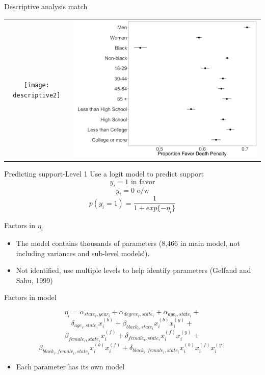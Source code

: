 \documentclass{beamer}
\begin{document}
	\begin{frame}{Descriptive analysis match}
		\begin{tabular}{cc}
		\texttt{[image: descriptive2]}&\includegraphics[scale=.15]{mydescriptive2} \\
		\end{tabular}
	\end{frame}
	
	\begin{frame}{Predicting support-Level 1}
		Use a logit model to predict support 
		\[ y_i = 1 \text{ in favor} \]
		\[  y_i = 0 \text{ o/w} \]
		\[ p(y_i = 1) = \frac{1}{1 + exp\{-\eta_i \}  } \]
	\end{frame}
	
	\begin{frame}{Factors in $ \eta_i $}

		\begin{itemize}
			\item The model contains thousands of parameters (8,466 in main model, not including variances and sub-level models!). 
			\item Not identified, use multiple levels to help identify parameters (Gelfand and Sahu, 1999)
		\end{itemize}
		\begin{description}
			\item[Factors in model] 
		\end{description}
			 $$ \eta_i = \alpha_{state_i, year_i} + \alpha_{degree_i, state_i} + \alpha_{age_i, state_i} +  $$
			 $$ \delta_{age_i, state_i}x^{(b)}_i + \beta_{black_i, state_i}x^{(b)}_ix^{(y)}_i  + $$
			 $$ \beta_{female_i, state_i} x^{(f)}_i +  \delta_{female_i, state_i}x^{(f)}_ix^{(y)}_i  + $$ 
		$$ \beta_{black_i, female_i, state_i}x^{(b)}_ix^{(f)}_i + \delta_{black_i, female_i, state_i}x^{(b)}_ix^{(f)}_ix^{(y)}_i $$
			\begin{itemize}
				\item Each parameter has its own model
			\end{itemize}
	\end{frame}
\end{document}
